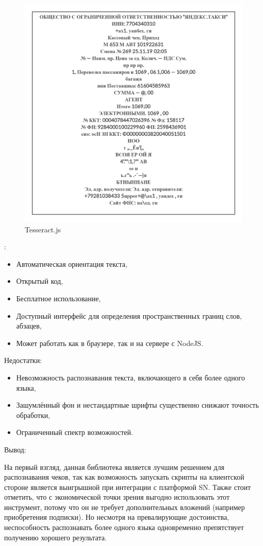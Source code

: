 \documentclass[14pt]{mmcs_article}
\begin{document}
\begin{figure}[H]
  \centering
  \includegraphics[scale=0.35]{test1.png}
  \caption{Tesseract.js}\label{stud:fig:2}
\end{figure}
:
\begin{itemize}
\item Автоматическая ориентация текста,
\item Открытый код,
\item Бесплатное использование,
\item Доступный интерфейс для определения пространственных границ слов, абзацев,
\item Может работать как в браузере, так и на сервере с NodeJS.
\end{itemize}
Недостатки:
\begin{itemize}
\item Невозможность распознавания текста, включающего в себя более одного языка,
\item Зашумлённый фон и нестандартные шрифты существенно снижают точность обработки,
\item Ограниченный спектр возможностей.
\end{itemize}
Вывод:

На первый взгляд, данная библиотека является лучшим решением для распознавания чеков, так как возможность запускать скрипты на клиентской стороне является выигрышной при интеграции с платформой SN. Также стоит отметить, что с экономической точки зрения выгодно использовать этот инструмент, потому что он не требует дополнительных вложений (например приобретения подписки). Но несмотря на превалирующие достоинства, неспособность распознавать более одного языка одновременно препятствует получению хорошего результата.
\end{document}
